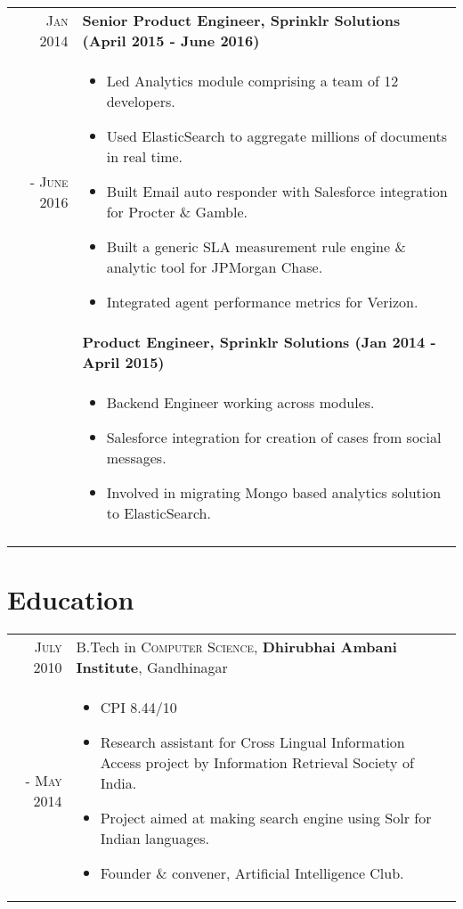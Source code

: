 \documentclass[a4paper,10pt]{article}
\begin{document}
\begin{tabular}{r|p{16cm}}
 \textsc{Jan 2014 } & \textbf{Senior Product Engineer, Sprinklr Solutions (April 2015 - June 2016)} \\\textsc{- June 2016}&
 \begin{itemize}[noitemsep]
 \item Led Analytics module comprising a team of 12 developers.
 \item Used ElasticSearch to aggregate millions of documents in real time.
 \item Built Email auto responder with Salesforce integration for Procter \& Gamble.
 \item Built a generic SLA measurement rule engine \& analytic tool for JPMorgan Chase.
 \item Integrated agent performance metrics for Verizon.
 \end{itemize}
 \\&
 \textbf{Product Engineer, Sprinklr Solutions (Jan 2014 - April 2015)} \\&
 \begin{itemize}[noitemsep]
 \item Backend Engineer working across modules.
 \item Salesforce integration for creation of cases from social messages.
 \item Involved in migrating Mongo based analytics solution to ElasticSearch.
 \end{itemize}
 \\\multicolumn{2}{c}{} \\
\end{tabular}


\section{Education}
\begin{tabular}{r|p{13cm}}
 \textsc{July 2010} & B.Tech in \textsc{Computer Science}, \textbf{Dhirubhai Ambani Institute}, Gandhinagar\\  \textsc{- May 2014} &
 \begin{itemize}[noitemsep]
 \item CPI 8.44/10
 \item Research assistant for Cross Lingual Information Access project by Information Retrieval Society of India.
 \item Project aimed at making search engine using Solr for Indian languages.
 \item Founder \& convener, Artificial Intelligence Club.
 \end{itemize}



\end{tabular}
\end{document}
